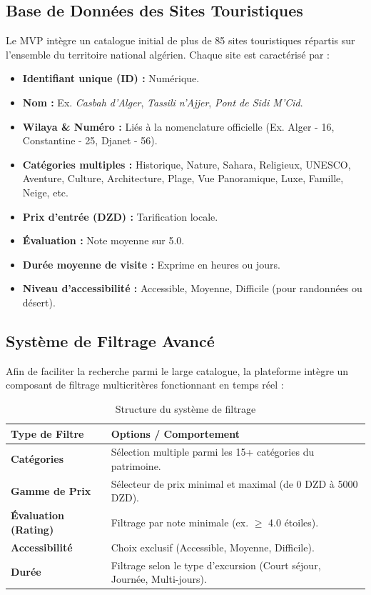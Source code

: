 \documentclass[11pt,a4paper]{article}
\begin{document}
\subsection{Base de Données des Sites Touristiques}
Le MVP intègre un catalogue initial de plus de 85 sites touristiques répartis sur l'ensemble du territoire national algérien. Chaque site est caractérisé par :
\begin{itemize}
    \item \textbf{Identifiant unique (ID) :} Numérique.
    \item \textbf{Nom :} Ex. \textit{Casbah d'Alger}, \textit{Tassili n'Ajjer}, \textit{Pont de Sidi M'Cid}.
    \item \textbf{Wilaya \& Numéro :} Liés à la nomenclature officielle (Ex. Alger - 16, Constantine - 25, Djanet - 56).
    \item \textbf{Catégories multiples :} Historique, Nature, Sahara, Religieux, UNESCO, Aventure, Culture, Architecture, Plage, Vue Panoramique, Luxe, Famille, Neige, etc.
    \item \textbf{Prix d'entrée (DZD) :} Tarification locale.
    \item \textbf{Évaluation :} Note moyenne sur 5.0.
    \item \textbf{Durée moyenne de visite :} Exprime en heures ou jours.
    \item \textbf{Niveau d'accessibilité :} Accessible, Moyenne, Difficile (pour randonnées ou désert).
\end{itemize}

\subsection{Système de Filtrage Avancé}
Afin de faciliter la recherche parmi le large catalogue, la plateforme intègre un composant de filtrage multicritères fonctionnant en temps réel :
\begin{table}[h]
    \centering
    \caption{Structure du système de filtrage}
    \vspace{0.2cm}
    \begin{tabularx}{\textwidth}{lX}
        \toprule
        \textbf{Type de Filtre} & \textbf{Options / Comportement} \\
        \midrule
        \textbf{Catégories} & Sélection multiple parmi les 15+ catégories du patrimoine. \\
        \textbf{Gamme de Prix} & Sélecteur de prix minimal et maximal (de 0 DZD à 5000 DZD). \\
        \textbf{Évaluation (Rating)} & Filtrage par note minimale (ex. $\ge$ 4.0 étoiles). \\
        \textbf{Accessibilité} & Choix exclusif (Accessible, Moyenne, Difficile). \\
        \textbf{Durée} & Filtrage selon le type d'excursion (Court séjour, Journée, Multi-jours). \\
        \bottomrule
    \end{tabularx}
\end{table}
\end{document}
